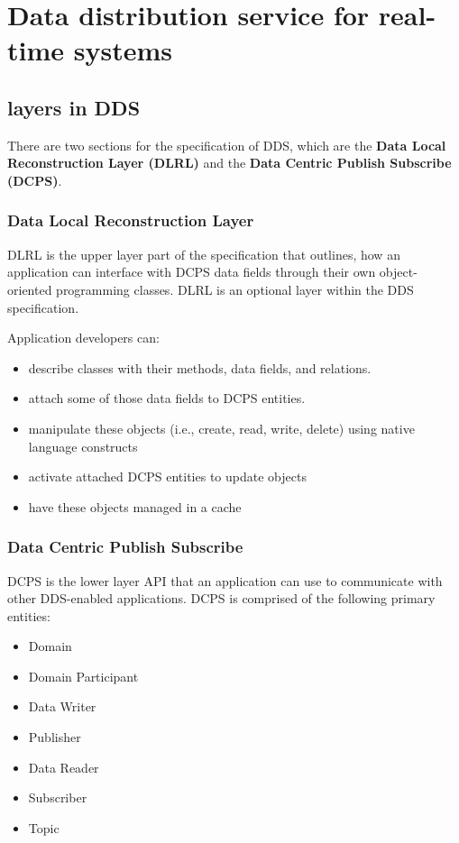 \section{Data distribution service for real-time systems}

\subsection{layers in DDS}

There are two sections for the specification of DDS, which are the \textbf{Data Local Reconstruction Layer (DLRL)} and the \textbf{Data Centric Publish Subscribe (DCPS)}.

\subsubsection{Data Local Reconstruction Layer}
DLRL is the upper layer part of the specification that outlines, how an application can interface with DCPS data fields through their own object-oriented programming classes. DLRL is an optional layer within the DDS specification.

Application developers can:
\begin{itemize}
\item describe classes with their methods, data fields, and relations.
\item attach some of those data fields to DCPS entities.
\item manipulate these objects (i.e., create, read, write, delete) using native language constructs
\item activate attached DCPS entities to update objects
\item have these objects managed in a cache
\end{itemize}

\subsubsection{Data Centric Publish Subscribe}	
DCPS is the lower layer API that an application can use to communicate with other DDS-enabled applications.
DCPS is comprised of the following primary entities:
\begin{itemize}
\item Domain
\item Domain Participant
\item Data Writer
\item Publisher
\item Data Reader
\item Subscriber
\item Topic
\end{itemize}

